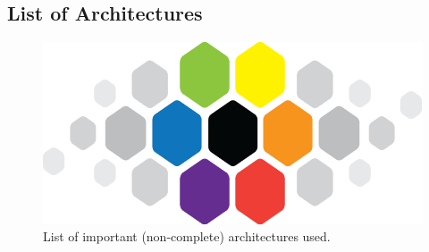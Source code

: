 \subsection*{List of Architectures}

\begin{figure}[!ht]
	\centering
	\includegraphics[width=14cm]{figures/cvl}
	\caption{List of important (non-complete) architectures used.}
  \label{fig:architectures}
\end{figure}
